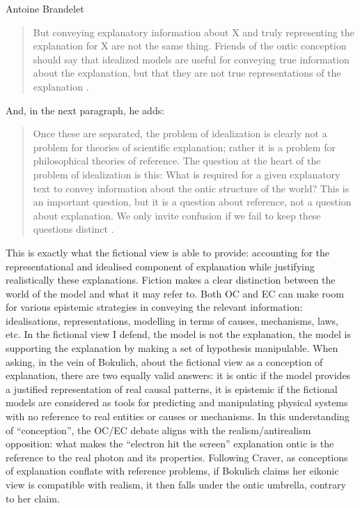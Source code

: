 \begin{artengenv}{Antoine Brandelet}
\begin{quote}
    But conveying explanatory information about X and truly representing the explanation for X are not the same thing. Friends of the ontic conception should say that idealized models are useful for conveying true information about the explanation, but that they are not true representations of the explanation \parencite[p.50]{Craver2014}.
\end{quote}

And, in the next paragraph, he adds:

\begin{quote}
    Once these are separated, the problem of idealization is clearly not a problem for theories of scientific explanation; rather it is a problem for philosophical theories of reference. The question at the heart of the problem of idealization is this: What is required for a given explanatory text to convey information about the ontic structure of the world? This is an important question, but it is a question about reference, not a question about explanation. We only invite confusion if we fail to keep these questions distinct \parencite[p.50]{Craver2014}.
\end{quote}

This is exactly what the fictional view is able to provide: accounting for the representational and idealised component of explanation while justifying realistically these explanations. Fiction makes a clear distinction between the world of the model and what it may refer to. Both OC and EC can make room for various epistemic strategies in conveying the relevant information: idealisations, representations, modelling in terms of causes, mechanisms, laws, etc. In the fictional view I defend, the model is not the explanation, the model is supporting the explanation by making a set of hypothesis manipulable. When asking, in the vein of Bokulich, about the fictional view as a conception of explanation, there are two equally valid answers: it is ontic if the model provides a justified representation of real causal patterns, it is epistemic if the fictional models are considered as tools for predicting and manipulating physical systems with no reference to real entities or causes or mechanisms. In this understanding of ``conception'', the OC/EC debate aligns with the realism/antirealism opposition: what makes the ``electron hit the screen'' explanation ontic is the reference to the real photon and its properties. Following Craver, as conceptions of explanation conflate with reference problems, if Bokulich claims her eikonic view is compatible with realism, it then falls under the ontic umbrella, contrary to her claim.


\end{artengenv}
